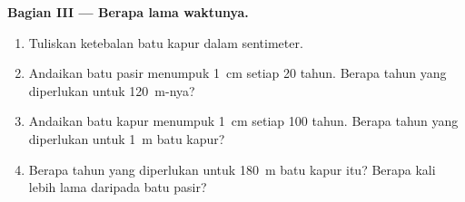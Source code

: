 \begin{problem}
\medskip
\noindent\textbf{Bagian III --- Berapa lama waktunya.}\par\nopagebreak
\begin{enumerate}[resume, beginpenalty=10000]
  \item Tuliskan ketebalan batu kapur dalam sentimeter.
  \item Andaikan batu pasir menumpuk \qty{1}{cm} setiap 20 tahun. Berapa
        tahun yang diperlukan untuk \qty{120}{m}-nya?
  \item Andaikan batu kapur menumpuk \qty{1}{cm} setiap 100 tahun. Berapa
        tahun yang diperlukan untuk \qty{1}{m} batu kapur?
  \item Berapa tahun yang diperlukan untuk \qty{180}{m} batu kapur itu?
        Berapa kali lebih lama daripada batu pasir?
\end{enumerate}
\end{problem}
